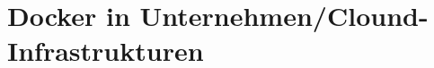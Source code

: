 \documentclass[../main.tex]{subfiles}
\begin{document}
\chapter{Docker in Unternehmen/Clound-Infrastrukturen}
\label{secInfrastructure}








\end{document}

